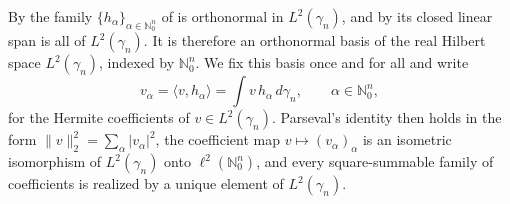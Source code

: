 \begin{definition}
By  the family $\{h_\alpha\}_{\alpha \in \mathbb{N}_0^n}$
of  is orthonormal in $L^2(\gamma_n)$, and by
 its closed linear span is all of $L^2(\gamma_n)$.
It is therefore an orthonormal basis of the real Hilbert space $L^2(\gamma_n)$,
indexed by $\mathbb{N}_0^n$.  We fix this basis once and for all and write
\[
  v_\alpha = \langle v, h_\alpha\rangle = \int v\, h_\alpha \, d\gamma_n,
  \qquad \alpha \in \mathbb{N}_0^n ,
\]
for the Hermite coefficients of $v \in L^2(\gamma_n)$.  Parseval's identity then
holds in the form $\|v\|_2^2 = \sum_{\alpha} |v_\alpha|^2$, the coefficient map
$v \mapsto (v_\alpha)_\alpha$ is an isometric isomorphism of $L^2(\gamma_n)$ onto
$\ell^2(\mathbb{N}_0^n)$, and every square-summable family of coefficients is
realized by a unique element of $L^2(\gamma_n)$.
\end{definition}
